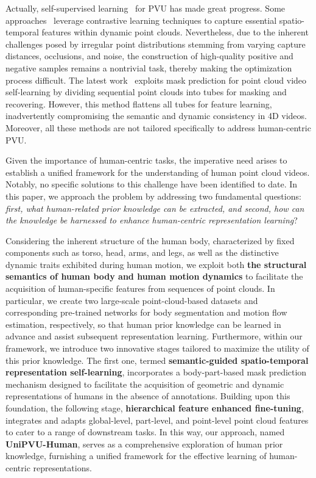 Actually, self-supervised learning~\cite{wang2021self,zhang2023complete} for PVU has made great progress. Some approaches~\cite{sheng2023contrastive,sheng2023point,shen2023pointcmp} leverage contrastive learning techniques to capture essential spatio-temporal features within dynamic point clouds. Nevertheless, due to the inherent challenges posed by irregular point distributions stemming from varying capture distances, occlusions, and noise, the construction of high-quality positive and negative samples remains a nontrivial task, thereby making the optimization process difficult. The latest work~\cite{shen2023masked} exploits mask prediction for point cloud video self-learning by dividing sequential point clouds into tubes for masking and recovering. However, this method flattens all tubes for feature learning, inadvertently compromising the semantic and dynamic consistency in 4D videos. Moreover, all these methods are not tailored specifically to address human-centric PVU.


Given the importance of human-centric tasks, the imperative need arises to establish a unified framework for the understanding of human point cloud videos. Notably, no specific solutions to this challenge have been identified to date. In this paper, we approach the problem by addressing two fundamental questions: \textit{first, what human-related prior knowledge can be extracted, and second, how can the knowledge be harnessed to enhance human-centric representation learning}?

Considering the inherent structure of the human body, characterized by fixed components such as torso, head, arms, and legs, as well as the distinctive dynamic traits exhibited during human motion, we exploit both \textbf{the structural semantics of human body and human motion dynamics} to facilitate the acquisition of human-specific features from sequences of point clouds. In particular, we create two large-scale point-cloud-based datasets and corresponding pre-trained networks for body segmentation and motion flow estimation, respectively, so that human prior knowledge can be learned in advance and assist subsequent representation learning. 
Furthermore, within our framework, we introduce two innovative stages tailored to maximize the utility of this prior knowledge. The first one, termed \textbf{semantic-guided spatio-temporal representation self-learning}, incorporates a body-part-based mask prediction mechanism designed to facilitate the acquisition of geometric and dynamic representations of humans in the absence of annotations. Building upon this foundation, the following stage, \textbf{hierarchical feature enhanced fine-tuning}, integrates and adapts global-level, part-level, and point-level point cloud features to cater to a range of downstream tasks. In this way, our approach, named \textbf{UniPVU-Human}, serves as a comprehensive exploration of human prior knowledge, furnishing a unified framework for the effective learning of human-centric representations.


